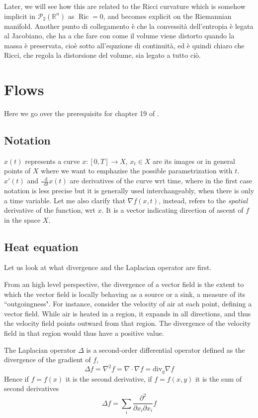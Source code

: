\documentclass[a4paper,12pt,reqno]{amsbook}
\theoremstyle{definition} %
\newcommand*\de{\mathop{}\!\mathrm{d}}
\newcommand{\1}{\mathbbm{1}}
\newcommand{\mP}{\mathscr{P}}
\newcommand{\R}{\ensuremath{\mathbb{R}}}
\DeclareMathOperator{\Ric}{Ric}
\def\Ric{\mathop{\mathrm{Ric}}\nolimits}
\theoremstyle{plain}
\theoremstyle{remark}
\begin{document}
{\begin{remark}
    Later, we will see how this are related to the Ricci curvature which is somehow implicit in $\mP_2(\R^n)$ as $\Ric=0$, and becomes explicit on the Riemannian manifold. Another punto di collegamento è che la convessità dell'entropia è legata al Jacobiano, che ha a che fare con come il volume viene distorto quando la massa è preservata, cioè sotto all'equzione di continuità, ed è quindi chiaro che Ricci, che regola la distorsione del volume, sia legato a tutto ciò. 
\end{remark}
\newpage
\chapter{Flows}
Here we go over the prerequisits for chapter 19 of \cite{brue}. 

\section{Notation}
$x(t)$ represents a curve $x:[0,T]\to X$, $x_t \in X$ are its images or in general points of $X$ where we want to emphazise the possible parametrization with $t$. $x'(t)$ and $\frac{\de}{\de t} x(t)$ are derivatives of the curve wrt time, where in the first case notation is less precise but it is generally used interchangeably, when there is only a time variable. 
Let me also clarify that $\nabla f(x,t)$, instead, refers to the \emph{spatial} derivative of the function, wrt $x$. It is a vector indicating direction of ascent of $f$ in the space $X$. %

\section{Heat equation}

Let us look at what divergence and the Laplacian operator are first. 

From an high level perspective, the divergence of a vector field is the extent to which the vector field is locally behaving as a source or a sink, a measure of its ``outgoingness". For instance, consider the velocity of air at each point, defining a vector field. While air is heated in a region, it expands in all directions, and thus the velocity field points outward from that region. The divergence of the velocity field in that region would thus have a positive value.

\begin{definition}
    The Laplacian operator $\Delta$ is a second-order differential operator defined as the divergence of the gradient of $f$,
\[
\Delta f = \nabla^2 f = \nabla \cdot \nabla f = \text{div}_g \nabla f
\]
Hence if $f=f(x)$ it is the second derivative, if $f=f(x,y)$ it is the sum of second derivatives
\[
\Delta f = \sum_i \frac{\partial^2}{\partial x_i \partial  x_i} f
\]
\end{definition}

}
\end{document}
